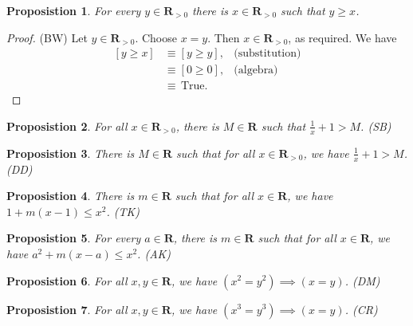 \documentclass[12pt,fleqn,answers]{exam}
\newcommand{\reals}{\mathbf{R}}
\newcommand{\true}{\, \mathrm{True}}
\newenvironment{myproof}
  {\begin{shaded}\begin{proof}}
  {\end{proof}\end{shaded}}
\newtheorem{prop}{Proposistion}
\begin{document}
       \begin{prop} For every $y \in \reals_{> 0}$ there is  
        $x \in \reals_{>0}$ such that $y \geq  x$.
      \end{prop}

       \begin{myproof} (BW) Let $y \in \reals_{>0}$. Choose $x = y$. Then $x \in \reals_{>0}$, as 
        required. We have
       \begin{align*}
         \left[y \geq x  \right] &\equiv \left[y \geq  y \right], & \mbox{(substitution)} \\
                                      &\equiv \left[0 \geq 0 \right], &\mbox{(algebra)} \\
                                      &\equiv \true.
       \end{align*}
       
       \end{myproof}

   


       
    \begin{prop} For all $x \in \reals_{>0}$, there is $M \in \reals$ such
     that $\frac{1}{x} +1 > M$. \hfill (SB)
    \end{prop}

    \begin{prop}
      There is $M \in \reals$ such that for all $x \in \reals_{>0}$,
     we have $\frac{1}{x} + 1 > M$. \hfill (DD) 
    \end{prop}

     \begin{prop}
      There is $m \in \reals$ such that for all $x \in \reals$, we 
     have $1 + m(x-1) \leq x^2$. \hfill (TK)
     \end{prop}

     \begin{prop} For every $a \in \reals$, there is $m \in \reals$ such 
     that for all $x \in \reals$, we have $a^2 + m(x-a) \leq x^2$. \hfill (AK)
     \end{prop}

     \begin{prop} For all $x,y \in \reals$, we have $(x^2 = y^2) \implies (x=y)$. 
     \hfill (DM)
     \end{prop} 

    \begin{prop} For all $x,y \in \reals$, we have $(x^3 = y^3) \implies (x=y)$. 
    \hfill (CR) 
    \end{prop}
\end{document}
